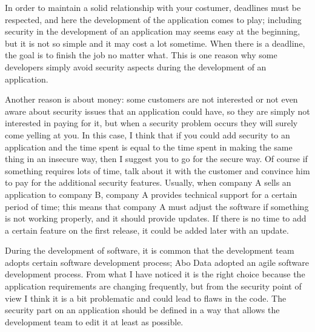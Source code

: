 In order to maintain a solid relationship with your costumer, deadlines must be respected, and here the development of the application comes to play; including security in the development of an application may seems easy at the beginning, but it is not so simple and it may cost a lot sometime. When there is a deadline, the goal is to finish the job no matter what.\newline
This is one reason why some developers simply avoid security aspects during the development of an application.\newline

Another reason is about money: some customers are not interested or not even aware about security issues that an application could have, so they are simply not interested in paying for it, but when a security problem occurs they will surely come yelling at you.\newline
In this case, I think that if you could add security to an application and the time spent is equal to the time spent in making the same thing in an insecure way, then I suggest you to go for the secure way.\newline
Of course if something requires lots of time, talk about it with the customer and convince him to pay for the additional security features.\newline
Usually, when company A sells an application to company B, company A provides technical support for a certain period of time; this means that company A must adjust the software if something is not working properly, and it should provide updates.
If there is no time to add a certain feature on the first release, it could be added later with an update.\newline

During the development of software, it is common that the development team adopts certain software development process; Abo Data adopted an agile software development process.\newline
From what I have noticed it is the right choice because the application requirements are changing frequently, but from the security point of view I think it is a bit problematic and could lead to flaws in the code.\newline
The security part on an application should be defined in a way that allows the development team to edit it at least as possible.\newline

